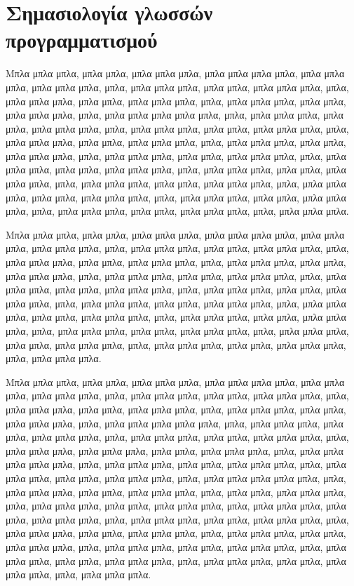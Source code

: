 \documentclass[diploma]{softlab-thesis}
\begin{document}
\section{Σημασιολογία γλωσσών προγραμματισμού}

Μπλα μπλα μπλα, μπλα μπλα, μπλα μπλα μπλα, μπλα μπλα μπλα μπλα,
μπλα μπλα μπλα, μπλα μπλα μπλα, μπλα, μπλα μπλα μπλα, μπλα μπλα,
μπλα μπλα μπλα, μπλα, μπλα μπλα μπλα, μπλα μπλα, μπλα μπλα μπλα,
μπλα, μπλα μπλα μπλα, μπλα μπλα, μπλα μπλα μπλα, μπλα, μπλα μπλα
μπλα μπλα μπλα, μπλα, μπλα μπλα μπλα, μπλα μπλα, μπλα μπλα μπλα,
μπλα, μπλα μπλα μπλα, μπλα μπλα, μπλα μπλα μπλα, μπλα, μπλα μπλα
μπλα, μπλα μπλα, μπλα μπλα μπλα, μπλα, μπλα μπλα μπλα, μπλα μπλα,
μπλα \nocite{*} μπλα μπλα, μπλα, μπλα μπλα μπλα, μπλα μπλα, μπλα
μπλα μπλα, μπλα, μπλα μπλα μπλα, μπλα μπλα, μπλα μπλα μπλα, μπλα,
μπλα μπλα μπλα, μπλα μπλα, μπλα μπλα μπλα, μπλα, μπλα μπλα μπλα,
μπλα μπλα, μπλα μπλα μπλα, μπλα, μπλα μπλα μπλα, μπλα μπλα, μπλα
μπλα μπλα, μπλα, μπλα μπλα μπλα, μπλα μπλα, μπλα μπλα μπλα, μπλα,
μπλα μπλα μπλα, μπλα μπλα, μπλα μπλα μπλα, μπλα, μπλα μπλα μπλα.

Μπλα μπλα μπλα, μπλα μπλα, μπλα μπλα μπλα, μπλα μπλα μπλα μπλα,
μπλα μπλα μπλα, μπλα μπλα μπλα, μπλα, μπλα μπλα μπλα, μπλα μπλα,
μπλα μπλα μπλα, μπλα, μπλα μπλα μπλα, μπλα μπλα, μπλα μπλα μπλα,
μπλα, μπλα μπλα μπλα, μπλα μπλα, μπλα μπλα μπλα, μπλα, μπλα μπλα
μπλα, μπλα μπλα, μπλα μπλα μπλα, μπλα, μπλα μπλα μπλα, μπλα μπλα,
μπλα μπλα μπλα, μπλα, μπλα μπλα μπλα, μπλα μπλα, μπλα μπλα μπλα,
μπλα, μπλα μπλα μπλα, μπλα μπλα, μπλα μπλα μπλα, μπλα, μπλα μπλα
μπλα, μπλα μπλα, μπλα μπλα μπλα, μπλα, μπλα μπλα μπλα, μπλα μπλα,
μπλα μπλα μπλα, μπλα, μπλα μπλα μπλα, μπλα μπλα, μπλα μπλα μπλα,
μπλα, μπλα μπλα μπλα, μπλα μπλα, μπλα μπλα μπλα, μπλα, μπλα μπλα
μπλα, μπλα μπλα, μπλα μπλα μπλα, μπλα, μπλα μπλα μπλα.

Μπλα μπλα μπλα, μπλα μπλα, μπλα μπλα μπλα, μπλα μπλα μπλα μπλα,
μπλα μπλα μπλα, μπλα μπλα μπλα, μπλα, μπλα μπλα μπλα, μπλα μπλα,
μπλα μπλα μπλα, μπλα, μπλα μπλα μπλα, μπλα μπλα, μπλα μπλα μπλα,
μπλα, μπλα μπλα μπλα, μπλα μπλα, μπλα μπλα μπλα, μπλα, μπλα μπλα
μπλα μπλα μπλα, μπλα, μπλα μπλα μπλα, μπλα μπλα, μπλα μπλα μπλα,
μπλα, μπλα μπλα μπλα, μπλα μπλα, μπλα μπλα μπλα, μπλα, μπλα μπλα
μπλα, μπλα μπλα μπλα, μπλα μπλα, μπλα μπλα μπλα, μπλα, μπλα μπλα
μπλα μπλα μπλα, μπλα, μπλα μπλα μπλα, μπλα μπλα, μπλα μπλα μπλα,
μπλα, μπλα μπλα μπλα, μπλα μπλα, μπλα μπλα μπλα, μπλα, μπλα μπλα
μπλα μπλα μπλα, μπλα, μπλα μπλα μπλα, μπλα μπλα, μπλα μπλα μπλα,
μπλα, μπλα μπλα, μπλα μπλα μπλα, μπλα, μπλα μπλα μπλα, μπλα μπλα,
μπλα μπλα μπλα, μπλα, μπλα μπλα μπλα, μπλα μπλα, μπλα μπλα μπλα,
μπλα, μπλα μπλα μπλα, μπλα μπλα, μπλα μπλα μπλα, μπλα, μπλα μπλα
μπλα, μπλα μπλα, μπλα μπλα μπλα, μπλα, μπλα μπλα μπλα, μπλα μπλα,
μπλα μπλα μπλα, μπλα, μπλα μπλα μπλα, μπλα μπλα, μπλα μπλα μπλα,
μπλα, μπλα μπλα μπλα, μπλα μπλα, μπλα μπλα μπλα, μπλα, μπλα μπλα
μπλα, μπλα μπλα, μπλα μπλα μπλα, μπλα, μπλα μπλα μπλα.
\end{document}
